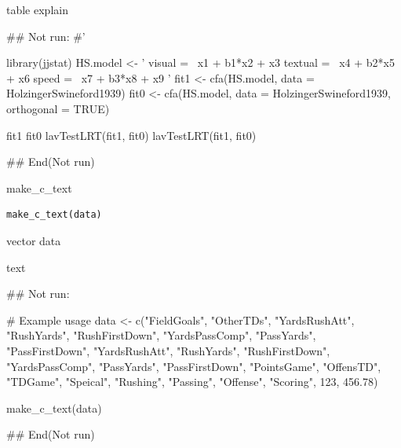 \documentclass[a4paper]{book}
\begin{document}
%
\begin{Value}
table explain
\end{Value}
%
\begin{Examples}
\begin{ExampleCode}

\#\# Not run: 
#'

library(jjstat)
HS.model <- '
    visual  =~ x1 + b1*x2 + x3
    textual =~ x4 + b2*x5 + x6
    speed   =~ x7 + b3*x8 + x9
'
fit1 <- cfa(HS.model, data = HolzingerSwineford1939)
fit0 <- cfa(HS.model, data = HolzingerSwineford1939,
            orthogonal = TRUE)

fit1 %
fit0 %
lavTestLRT(fit1, fit0)
lavTestLRT(fit1, fit0) %

## End(Not run)


\end{ExampleCode}
\end{Examples}
%
\begin{Description}
make\_c\_text
\end{Description}
%
\begin{Usage}
\begin{verbatim}
make_c_text(data)
\end{verbatim}
\end{Usage}
%
\begin{Arguments}
\begin{ldescription}
\item[\code{data}] vector data
\end{ldescription}
\end{Arguments}
%
\begin{Value}
text
\end{Value}
%
\begin{Examples}
\begin{ExampleCode}


\#\# Not run: 

# Example usage
data <- c("FieldGoals", "OtherTDs", "YardsRushAtt", "RushYards",
          "RushFirstDown", "YardsPassComp", "PassYards", "PassFirstDown",
          "YardsRushAtt", "RushYards", "RushFirstDown", "YardsPassComp",
          "PassYards", "PassFirstDown", "PointsGame", "OffensTD",
          "TDGame", "Speical", "Rushing", "Passing",
          "Offense", "Scoring", 123, 456.78)

make_c_text(data)


## End(Not run)
\end{ExampleCode}
\end{Examples}
\end{document}
